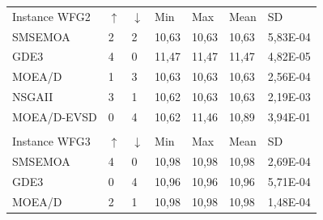\begin{table}[H]
\begin{scriptsize}
{\begin{tabular}{lllllll}
  &  &  &  &  &  &  \\ \hline
 \multicolumn{1}{|l|}{Instance WFG2} & \multicolumn{1}{l|}{$\uparrow$} & \multicolumn{1}{l|}{$\downarrow$} & \multicolumn{1}{l|}{Min} & \multicolumn{1}{l|}{Max} & \multicolumn{1}{l|}{Mean} & \multicolumn{1}{l|}{SD} \\ \hline
 \multicolumn{1}{|l|}{SMSEMOA} & \multicolumn{1}{l|}{2} & \multicolumn{1}{l|}{2} & \multicolumn{1}{l|}{10,63} & \multicolumn{1}{l|}{10,63} & \multicolumn{1}{l|}{10,63} & \multicolumn{1}{l|}{5,83E-04} \\ \hline
 \multicolumn{1}{|l|}{GDE3} & \multicolumn{1}{l|}{4} & \multicolumn{1}{l|}{0} & \multicolumn{1}{l|}{11,47} & \multicolumn{1}{l|}{11,47} & \multicolumn{1}{l|}{11,47} & \multicolumn{1}{l|}{4,82E-05} \\ \hline
 \multicolumn{1}{|l|}{MOEA/D} & \multicolumn{1}{l|}{1} & \multicolumn{1}{l|}{3} & \multicolumn{1}{l|}{10,63} & \multicolumn{1}{l|}{10,63} & \multicolumn{1}{l|}{10,63} & \multicolumn{1}{l|}{2,56E-04} \\ \hline
 \multicolumn{1}{|l|}{NSGAII} & \multicolumn{1}{l|}{3} & \multicolumn{1}{l|}{1} & \multicolumn{1}{l|}{10,62} & \multicolumn{1}{l|}{10,63} & \multicolumn{1}{l|}{10,63} & \multicolumn{1}{l|}{2,19E-03} \\ \hline
 \multicolumn{1}{|l|}{MOEA/D-EVSD} & \multicolumn{1}{l|}{0} & \multicolumn{1}{l|}{4} & \multicolumn{1}{l|}{10,62} & \multicolumn{1}{l|}{11,46} & \multicolumn{1}{l|}{10,89} & \multicolumn{1}{l|}{3,94E-01} \\ \hline
  &  &  &  &  &  &  \\ \hline
\multicolumn{1}{|l|}{Instance WFG3} & \multicolumn{1}{l|}{$\uparrow$} & \multicolumn{1}{l|}{$\downarrow$} & \multicolumn{1}{l|}{Min} & \multicolumn{1}{l|}{Max} & \multicolumn{1}{l|}{Mean} & \multicolumn{1}{l|}{SD} \\ \hline
\multicolumn{1}{|l|}{SMSEMOA} & \multicolumn{1}{l|}{4} & \multicolumn{1}{l|}{0} & \multicolumn{1}{l|}{10,98} & \multicolumn{1}{l|}{10,98} & \multicolumn{1}{l|}{10,98} & \multicolumn{1}{l|}{2,69E-04} \\ \hline
\multicolumn{1}{|l|}{GDE3} & \multicolumn{1}{l|}{0} & \multicolumn{1}{l|}{4} & \multicolumn{1}{l|}{10,96} & \multicolumn{1}{l|}{10,96} & \multicolumn{1}{l|}{10,96} & \multicolumn{1}{l|}{5,71E-04} \\ \hline
\multicolumn{1}{|l|}{MOEA/D} & \multicolumn{1}{l|}{2} & \multicolumn{1}{l|}{1} & \multicolumn{1}{l|}{10,98} & \multicolumn{1}{l|}{10,98} & \multicolumn{1}{l|}{10,98} & \multicolumn{1}{l|}{1,48E-04} \\ \hline

\end{tabular}}
\end{scriptsize}
\end{table}

